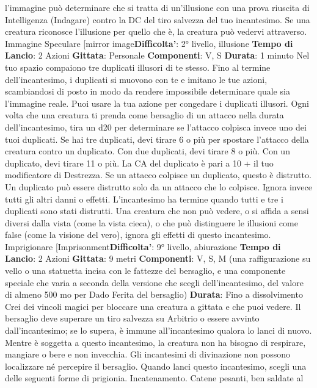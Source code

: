 \begin{multicols}{2}
l’immagine può determinare che si tratta di un’illusione
con una prova riuscita di Intelligenza (Indagare) contro
la DC del tiro salvezza del tuo incantesimo. Se una
creatura riconosce l’illusione per quello che è, la
creatura può vedervi attraverso.
Immagine Speculare
[mirror image\textbf{Difficolta'}:
2° livello, illusione
\textbf{Tempo di Lancio}: 2 Azioni
\textbf{Gittata}: Personale
\textbf{Componenti}: V, S
\textbf{Durata}: 1 minuto
Nel tuo spazio compaiono tre duplicati illusori di te
stesso. Fino al termine dell’incantesimo, i duplicati si
muovono con te e imitano le tue azioni, scambiandosi di
posto in modo da rendere impossibile determinare
quale sia l’immagine reale. Puoi usare la tua azione per
congedare i duplicati illusori.
Ogni volta che una creatura ti prenda come bersaglio di
un attacco nella durata dell’incantesimo, tira un d20 per
determinare se l’attacco colpisca invece uno dei tuoi
duplicati.
Se hai tre duplicati, devi tirare 6 o più per spostare
l’attacco della creatura contro un duplicato. Con due
duplicati, devi tirare 8 o più. Con un duplicato, devi
tirare 11 o più.
La CA del duplicato è pari a 10 + il tuo modificatore di
Destrezza. Se un attacco colpisce un duplicato, questo
è distrutto. Un duplicato può essere distrutto solo da un
attacco che lo colpisce. Ignora invece tutti gli altri danni
o effetti. L’incantesimo ha termine quando tutti e tre i
duplicati sono stati distrutti.
Una creatura che non può vedere, o si affida a sensi
diversi dalla vista (come la vista cieca), o che può 
distinguere le illusioni come false (come la visione del
vero), ignora gli effetti di questo incantesimo.
Imprigionare
[Imprisonment\textbf{Difficolta'}:
9° livello, abiurazione
\textbf{Tempo di Lancio}: 2 Azioni
\textbf{Gittata}: 9 metri
\textbf{Componenti}: V, S, M (una raffigurazione su vello o una
statuetta incisa con le fattezze del bersaglio, e una
componente speciale che varia a seconda della
versione che scegli dell’incantesimo, del valore di
almeno 500 mo per Dado Ferita del bersaglio)
\textbf{Durata}: Fino a dissolvimento
Crei dei vincoli magici per bloccare una creatura a
gittata e che puoi vedere. Il bersaglio deve superare un
tiro salvezza su Arbitrio o essere avvinto
dall’incantesimo; se lo supera, è immune
all’incantesimo qualora lo lanci di nuovo. Mentre è
soggetta a questo incantesimo, la creatura non ha
bisogno di respirare, mangiare o bere e non invecchia.
Gli incantesimi di divinazione non possono localizzare
né percepire il bersaglio.
Quando lanci questo incantesimo, scegli una delle
seguenti forme di prigionia.
Incatenamento. Catene pesanti, ben saldate al

\end{multicols}
